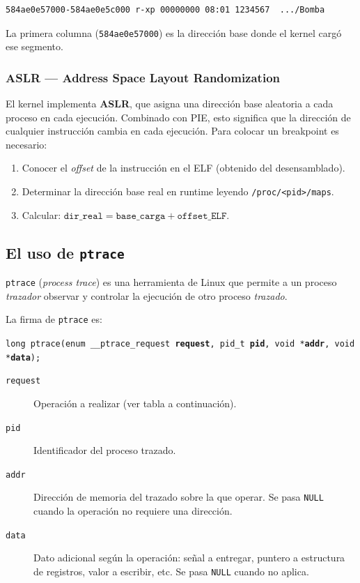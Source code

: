\documentclass[10pt,a4paper]{article}
\begin{document}
\begin{lstlisting}[style=termstyle, caption={Ejemplo de linea en /proc/<pid>/maps para la Bomba}]
584ae0e57000-584ae0e5c000 r-xp 00000000 08:01 1234567  .../Bomba
\end{lstlisting}

La primera columna (\texttt{584ae0e57000}) es la dirección base donde el kernel cargó ese segmento.

\subsubsection*{ASLR — Address Space Layout Randomization}

El kernel implementa \textbf{ASLR}, que asigna una dirección base aleatoria a cada proceso en cada ejecución. Combinado con PIE, esto significa que la dirección de cualquier instrucción cambia en cada ejecución. Para colocar un breakpoint es necesario:
\begin{enumerate}[label=\arabic*.]
    \item Conocer el \textit{offset} de la instrucción en el ELF (obtenido del desensamblado).
    \item Determinar la dirección base real en runtime leyendo \texttt{/proc/<pid>/maps}.
    \item Calcular: $\texttt{dir\_real} = \texttt{base\_carga} + \texttt{offset\_ELF}$.
\end{enumerate}

\subsection{El uso de \texttt{ptrace}}

\texttt{ptrace} (\textit{process trace}) es una herramienta de Linux que permite a un proceso \textit{trazador} observar y controlar la ejecución de otro proceso \textit{trazado}.

La firma de \texttt{ptrace} es:

\begin{center}
\texttt{long ptrace(enum \_\_ptrace\_request \textbf{request}, pid\_t \textbf{pid}, void *\textbf{addr}, void *\textbf{data});}
\end{center}

\begin{description}
    \item[\texttt{request}] Operación a realizar (ver tabla a continuación).
    \item[\texttt{pid}] Identificador del proceso trazado.
    \item[\texttt{addr}] Dirección de memoria del trazado sobre la que operar. Se pasa \texttt{NULL} cuando la operación no requiere una dirección.
    \item[\texttt{data}] Dato adicional según la operación: señal a entregar, puntero a estructura de registros, valor a escribir, etc. Se pasa \texttt{NULL} cuando no aplica.
\end{description}
\end{document}
